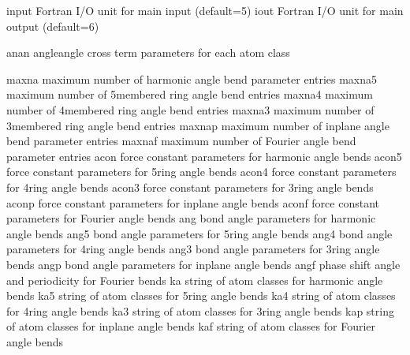\documentclass[letterpaper,11pt,english]{sphinxmanual}
\begin{document}

\begin{sphinxVerbatim}[commandchars=\\\{\}]
input           Fortran I/O unit for main input (default=5)
iout            Fortran I/O unit for main output (default=6)
\end{sphinxVerbatim}


\begin{sphinxVerbatim}[commandchars=\\\{\}]
anan            angle\PYGZhy{}angle cross term parameters for each atom class
\end{sphinxVerbatim}


\begin{sphinxVerbatim}[commandchars=\\\{\}]
maxna           maximum number of harmonic angle bend parameter entries
maxna5          maximum number of 5\PYGZhy{}membered ring angle bend entries
maxna4          maximum number of 4\PYGZhy{}membered ring angle bend entries
maxna3          maximum number of 3\PYGZhy{}membered ring angle bend entries
maxnap          maximum number of in\PYGZhy{}plane angle bend parameter entries
maxnaf          maximum number of Fourier angle bend parameter entries
acon            force constant parameters for harmonic angle bends
acon5           force constant parameters for 5\PYGZhy{}ring angle bends
acon4           force constant parameters for 4\PYGZhy{}ring angle bends
acon3           force constant parameters for 3\PYGZhy{}ring angle bends
aconp           force constant parameters for in\PYGZhy{}plane angle bends
aconf           force constant parameters for Fourier angle bends
ang             bond angle parameters for harmonic angle bends
ang5            bond angle parameters for 5\PYGZhy{}ring angle bends
ang4            bond angle parameters for 4\PYGZhy{}ring angle bends
ang3            bond angle parameters for 3\PYGZhy{}ring angle bends
angp            bond angle parameters for in\PYGZhy{}plane angle bends
angf            phase shift angle and periodicity for Fourier bends
ka              string of atom classes for harmonic angle bends
ka5             string of atom classes for 5\PYGZhy{}ring angle bends
ka4             string of atom classes for 4\PYGZhy{}ring angle bends
ka3             string of atom classes for 3\PYGZhy{}ring angle bends
kap             string of atom classes for in\PYGZhy{}plane angle bends
kaf             string of atom classes for Fourier angle bends
\end{sphinxVerbatim}
\end{document}
